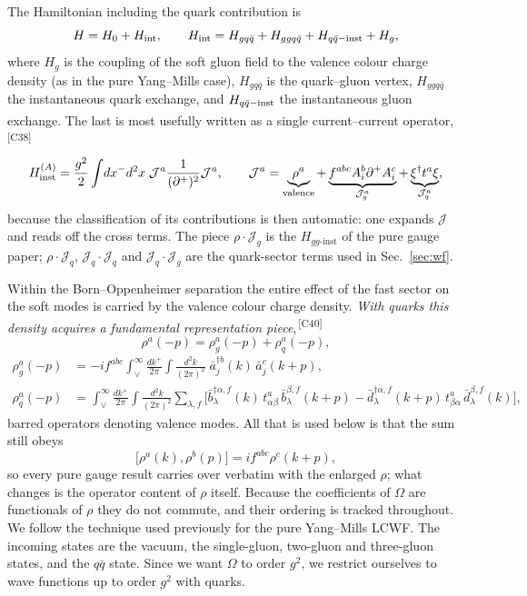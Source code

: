 \documentclass[11pt]{article}
\newcommand{\dg}{\dagger}
\newcommand{\OM}{\Omega}
\newcommand{\Jc}{\mathcal{J}}
\newcommand{\chg}[1]{{\color{blue!70!black}\textsuperscript{\,[C#1]}}}
\begin{document}
The Hamiltonian including the quark contribution is
\begin{equation}
H=H_{0}+H_{\rm int},\qquad
H_{\rm int}=H_{gq\bar q}+H_{ggq\bar q}+H_{q\bar q-\rm inst}+H_{g},
\label{eq:H}
\end{equation}
where $H_{g}$ is the coupling of the soft gluon field to the valence colour charge density (as in
the pure Yang--Mills case), $H_{gq\bar q}$ is the quark--gluon vertex, $H_{ggq\bar q}$ the
instantaneous quark exchange, and $H_{q\bar q-\rm inst}$ the instantaneous gluon exchange. The
last is most usefully written as a single current--current operator,\chg{38}
\begin{equation}
H^{(A)}_{\rm inst}=\frac{g^{2}}{2}\int\! dx^{-}d^{2}x\;\Jc^{a}\frac{1}{(\partial^{+})^{2}}\Jc^{a},
\qquad
\Jc^{a}=\underbrace{\rho^{a}}_{\rm valence}
+\underbrace{f^{abc}A^{b}_{i}\partial^{+}A^{c}_{i}}_{\Jc^{a}_{g}}
+\underbrace{\xi^{\dg}t^{a}\xi}_{\Jc^{a}_{q}},
\label{eq:HinstA}
\end{equation}
because the classification of its contributions is then automatic: one expands $\Jc$ and reads off
the cross terms. The piece $\rho\!\cdot\!\Jc_{g}$ is the $H_{gg\text{-inst}}$ of the pure gauge
paper; $\rho\!\cdot\!\Jc_{q}$, $\Jc_{q}\!\cdot\!\Jc_{q}$ and $\Jc_{q}\!\cdot\!\Jc_{g}$ are the
quark-sector terms used in Sec.~\ref{sec:wf}.

Within the Born--Oppenheimer separation the entire effect of the fast sector on the soft modes is
carried by the valence colour charge density. \emph{With quarks this density acquires a
fundamental representation piece},\chg{40}
\begin{equation}
\rho^{a}(-p)=\rho^{a}_{g}(-p)+\rho^{a}_{q}(-p),
\label{eq:rho}
\end{equation}
\begin{align}
\rho^{a}_{g}(-p)&=-if^{abc}\!\int_{\vee}^{\infty}\!\!\frac{dk^{+}}{2\pi}\!\int\!\frac{d^{2}k}{(2\pi)^{2}}\;
\bar a^{\dg b}_{j}(k)\,\bar a^{c}_{j}(k+p),
\nonumber\\
\rho^{a}_{q}(-p)&=\int_{\vee}^{\infty}\!\!\frac{dk^{+}}{2\pi}\!\int\!\frac{d^{2}k}{(2\pi)^{2}}
\sum_{\lambda,f}\Big[\bar b^{\dg\alpha,f}_{\lambda}(k)\,t^{a}_{\alpha\beta}\,
\bar b^{\beta,f}_{\lambda}(k+p)
-\bar d^{\dg\alpha,f}_{\lambda}(k+p)\,t^{a}_{\beta\alpha}\,\bar d^{\beta,f}_{\lambda}(k)\Big],
\end{align}
barred operators denoting valence modes. All that is used below is that the sum still obeys
\begin{equation}
\big[\rho^{a}(k),\rho^{b}(p)\big]=if^{abc}\rho^{c}(k+p),
\label{eq:rhoalgebra}
\end{equation}
so every pure gauge result carries over verbatim with the enlarged $\rho$; what changes is the
operator content of $\rho$ itself. Because the coefficients of $\OM$ are functionals of $\rho$
they do not commute, and their ordering is tracked throughout. We
follow the technique used previously for the pure Yang--Mills LCWF. The incoming states are the
vacuum, the single-gluon, two-gluon and three-gluon states, and the $q\bar q$ state. Since we want
$\OM$ to order $g^{2}$, we restrict ourselves to wave functions up to order $g^{2}$ with quarks.
\end{document}
